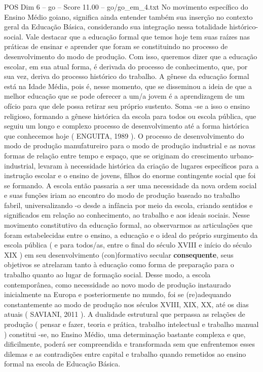 \begin{textsample}{POS Dim 6 – go – Score 11.00 – go/go\_em\_4.txt}
No movimento específico do Ensino Médio goiano, significa ainda entender também sua inserção no contexto geral da Educação Básica, considerando sua integração nessa totalidade histórico-social.
Vale destacar que a educação formal que temos hoje tem suas raízes nas práticas de ensinar e aprender que foram se constituindo no processo de desenvolvimento do modo de produção.
Com isso, queremos dizer que a educação escolar, em sua atual forma, é derivada do processo de conhecimento, que, por sua vez, deriva do processo histórico do trabalho.
A gênese da educação formal está na Idade Média, pois é, nesse momento, que se disseminou a ideia de que a melhor educação que se pode oferecer a um/a jovem é a aprendizagem de um ofício para que dele possa retirar seu próprio sustento.
Soma -se a isso o ensino religioso, formando a gênese histórica da escola para todos ou escola pública, que seguiu um longo e complexo processo de desenvolvimento até a forma histórica que conhecemos hoje ( ENGUITA, 1989 ).
O processo de desenvolvimento do modo de produção manufatureiro para o modo de produção industrial e as novas formas de relação entre tempo e espaço, que se originam do crescimento urbano-industrial, levaram à necessidade histórica da criação de lugares específicos para a instrução escolar e o ensino de jovens, filhos do enorme contingente social que foi se formando.
A escola então passaria a ser uma necessidade da nova ordem social e suas funções iriam ao encontro do modo de produção baseado no trabalho fabril, universalizando -o desde a infância por meio da escola, criando sentidos e significados em relação ao conhecimento, ao trabalho e aos ideais sociais.
Nesse movimento constitutivo da educação formal, ao observarmos as articulações que foram estabelecidas entre o ensino, a educação e o ideal do próprio surgimento da escola pública ( e para todos/as, entre o final do século XVIII e início do século XIX ) em seu desenvolvimento (con)formativo secular \textbf{consequente}, seus objetivos se atrelaram tanto à educação como forma de preparação para o trabalho quanto ao lugar de formação social.
Desse modo, a escola contemporânea, como necessidade ao novo modo de produção instaurado inicialmente na Europa e posteriormente no mundo, foi se (re)adequando constantemente ao modo de produção nos séculos XVIII, XIX, XX, até os dias atuais ( SAVIANI, 2011 ).
A dualidade estrutural que perpassa as relações de produção ( pensar e fazer, teoria e prática, trabalho intelectual e trabalho manual ) constitui -se, no Ensino Médio, uma determinação bastante complexa e que, dificilmente, poderá ser compreendida e transformada sem que enfrentemos esses dilemas e as contradições entre capital e trabalho quando remetidos ao ensino formal na escola de Educação Básica.

\end{textsample}

